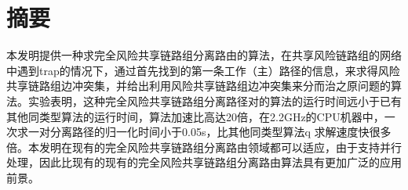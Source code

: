 ﻿
\newpage
\thispagestyle{fancy}
\fancyhf{} %
\setcounter{page}{1}
\fancyfoot[C]{\bfseries\thepage}
\fancyhead[CO]{\bfseries\rightmark}
\fancyhead[RE]{\bfseries\leftmark}
\renewcommand{\headrulewidth}{0.4pt}
\renewcommand{\footrulewidth}{0pt}
\section*{摘要}
本发明提供一种求完全风险共享链路组分离路由的算法，在共享风险链路组的网络中遇到trap的情况下，通过首先找到的第一条工作（主）路径的信息，来求得风险共享链路组边冲突集，并给出利用风险共享链路组边冲突集来分而治之原问题的算法。实验表明，这种完全风险共享链路组分离路径对的算法的运行时间远小于已有其他同类型算法的运行时间，算法加速比高达20倍，在2.2GHz的CPU机器中，一次求一对分离路径的归一化时间小于0.05s，比其他同类型算法q 求解速度快很多倍。本发明在现有的完全风险共享链路组分离路由领域都可以适应，由于支持并行处理，因此比现有的现有的完全风险共享链路组分离路由算法具有更加广泛的应用前景。
